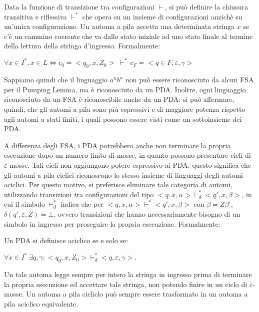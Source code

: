   Data la funzione di transizione tra configurazioni \(\vdash\), si può definire la chiusura transitiva e riflessiva \(\vdash^*\) che opera su un insieme di configurazioni anzichè su un'unica configurazione. Un automa a pila accetta una determinata stringa \(x\) se c’è un cammino coerente che va dallo stato iniziale ad uno stato finale al termine della lettura della stringa d’ingresso. Formalmente:

  \begin{math}
    \forall x \in I^*, x \in L \Leftrightarrow c_0=<q_0,x, Z_0>\;\vdash^*\,c_F=<q\in F, \varepsilon, \gamma>
  \end{math}

  \vspace{10pt}

  Sappiamo quindi che il linguaggio \(a^nb^n\) non può essere riconosciuto da alcun FSA per il Pumping Lemma, ma è riconosciuto da un PDA. Inoltre, ogni linguaggio riconosciuto da un FSA è riconoscibile anche da un PDA: si può affermare, quindi, che gli automi a pila sono più espressivi e di maggiore potenza rispetto agli automi a stati finiti, i quali possono essere visti come un sottoinsieme dei PDA. 

  A differenza degli FSA, i PDA potrebbero anche non terminare la propria esecuzione dopo un numero finito di mosse, in quanto possono presentare cicli di \(\varepsilon\)-mosse. Tali cicli non aggiungono potere espressivo ai PDA: questo significa che gli automi a pila ciclici riconoscono lo stesso insieme di linguaggi degli automi aciclici. Per questo motivo, si preferisce eliminare tale categoria di automi, utilizzando transizioni tra configurazioni del tipo \(<q,x,\alpha>\vdash^*_d<q',x,\beta>\), in cui il simbolo \(\vdash_d^*\) indica che per \(<q,x,\alpha>\vdash^*<q',x,\beta>\) con \(\beta = Z\beta'\), \(\delta(q', \varepsilon, Z) = \bot\), ovvero transizioni che hanno necessariamente bisogno di un simbolo in ingresso per proseguire la propria esecuzione. Formalmente:

  \begin{definition}
    Un PDA si definisce aciclico se e solo se:

    \begin{math}
      \forall x \in I^*\; \exists q,\gamma : <q_0, x, Z_0> \vdash_d^* <q, \varepsilon, \gamma>.
    \end{math}
  \end{definition}

  Un tale automa legge sempre per intero la stringa in ingresso prima di terminare la propria esecuzione ed accettare tale stringa, non potendo finire in un ciclo di \(\varepsilon\)-mosse. Un automa a pila cicliclo può sempre essere trasformato in un automa a pila aciclico equivalente.


